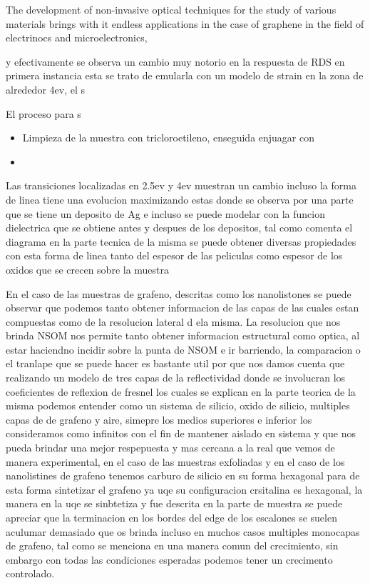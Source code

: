 The development of non-invasive optical techniques for the study of various materials brings with it endless applications in the case of graphene in the field of electrinocs and microelectronics, 



y efectivamente se observa un cambio muy notorio en la respuesta de RDS en primera instancia esta se trato de emularla con un modelo de strain en la zona 
de alrededor 4ev, el s



El proceso para s

\begin{itemize}
	\item Limpieza de la muestra con tricloroetileno, enseguida enjuagar con 
	\item 
\end{itemize}
Las transiciones localizadas en 2.5ev y 4ev muestran un cambio incluso la forma de linea tiene una evolucion maximizando estas donde se observa por una parte que se tiene un deposito de Ag e incluso se puede modelar con la funcion dielectrica que se obtiene antes y despues de los depositos, tal como comenta el diagrama en la parte tecnica de la misma se puede obtener diversas propiedades con esta forma de linea tanto del espesor de las peliculas como espesor de los oxidos que se crecen sobre la muestra


En el caso de las muestras de grafeno, descritas como los nanolistones se puede observar que podemos tanto obtener informacion de las capas de las cuales estan compuestas como de la resolucion lateral d ela misma. 
La resolucion que nos brinda NSOM nos permite tanto obtener informacion estructural como optica, al estar haciendno incidir sobre la punta de NSOM e ir barriendo, la comparacion o el tranlape que se puede hacer es bastante util por que nos damos cuenta que realizando un modelo de tres capas de la reflectividad donde se involucran los coeficientes de reflexion de fresnel los cuales se explican en la parte teorica de la misma podemos entender como un sistema de silicio, oxido de silicio, multiples capas de  de grafeno y aire, simepre los medios superiores e inferior los consideramos como infinitos con el fin de mantener aislado en sistema y que nos pueda brindar una mejor respepuesta y mas cercana a la real que vemos de manera experimental,  en el caso de las muestras exfoliadas y en el caso de los nanolistines de grafeno tenemos carburo de silicio en su forma hexagonal para de esta forma sintetizar el grafeno ya uqe su configuracion crsitalina es hexagonal, la manera en la uqe se sinbtetiza y fue descrita en la parte de muestra se puede apreciar que la terminacion en los bordes del edge de los escalones se suelen aculumar demasiado que os brinda incluso en muchos casos multiples monocapas de grafeno, tal como se menciona en una manera comun del crecimiento, sin embargo con todas las condiciones esperadas podemos tener un crecimento controlado.

